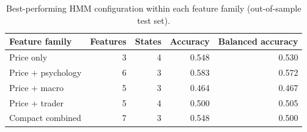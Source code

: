 \begin{table}
\caption{Best-performing HMM configuration within each feature family (out-of-sample test set).}
\label{tab:feature_families}
\begin{tabular}{lrrrr}
\toprule
Feature family & Features & States & Accuracy & Balanced accuracy \\
\midrule
Price only & 3 & 4 & 0.548 & 0.530 \\
Price + psychology & 6 & 3 & 0.583 & 0.572 \\
Price + macro & 5 & 3 & 0.464 & 0.467 \\
Price + trader & 5 & 4 & 0.500 & 0.505 \\
Compact combined & 7 & 3 & 0.548 & 0.500 \\
\bottomrule
\end{tabular}
\end{table}
